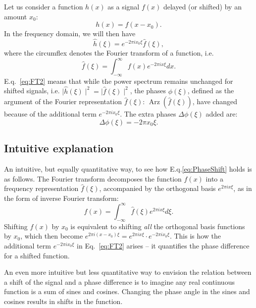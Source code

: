 Let us consider a function $h(x)$ as a signal $f(x)$ delayed (or shifted) by an amount $x_0$:
\begin{equation}
	h(x) = f(x-x_0).
\label{eq:FT1}
\end{equation}
In the frequency domain, we will then have 
\begin{equation}
	\hat{h}(\xi) = e^{-2 \pi ix_0 \xi} \hat{f}(\xi),
\label{eq:FT2}
\end{equation}
where the circumflex denotes the Fourier transform of a function, i.e.
\begin{equation}
	\hat{f}(\xi) = \int_{-\infty}^{\infty} f(x) e^{-2 \pi ix \xi} dx.
\label{eq:FT3}
\end{equation}
E.q.~\ref{eq:FT2} means that while the power spectrum remains unchanged for shifted signals, i.e. $\mid \hat{h}(\xi)\mid ^2 = \mid\hat{f}(\xi)\mid^2$, the phases $\phi(\xi)$, defined as the argument of the Fourier representation $\hat{f}(\xi)$:  $\operatorname{Arz}(\hat{f}(\xi))$, have changed because of the additional term $e^{-2 \pi ix_0 \xi}$. The extra phases $\Delta \phi(\xi)$ added are: 
\begin{equation}
	\Delta \phi(\xi) = -2 \pi x_0 \xi.
\label{eq:PhaseShift}
\end{equation}

\subsection{Intuitive explanation}

An intuitive, but equally quantitative way, to see how E.q.\ref{eq:PhaseShift} holds is as follows. The Fourier transform decomposes the function $f(x)$ into a frequency representation $\hat{f}(\xi)$, accompanied by the orthogonal basis $e^{2 \pi ix \xi}$, as in the form of inverse Fourier transform: 
\begin{equation}
	f(x) = \int_{-\infty}^{\infty} \hat{f}(\xi) e^{2 \pi ix \xi} d\xi. 
\end{equation}
Shifting $f(x)$ by $x_0$ is equivalent to shifting \textit{all} the orthogonal basis functions by $x_0$, which then become $e^{2 \pi i(x-x_0) \xi} = e^{2 \pi i x \xi} \cdot e^{-2 \pi ix_0 \xi}$. This is how the additional term $e^{-2 \pi ix_0 \xi}$ in Eq.~\ref{eq:FT2} arises -- it quantifies the phase difference for a shifted function. 

An even more intuitive but less quantitative way to envision the relation between a shift of the signal and a phase difference is to imagine any real continuous function is a sum of sines and cosines. Changing the phase angle in the sines and cosines results in shifts in the function. 

